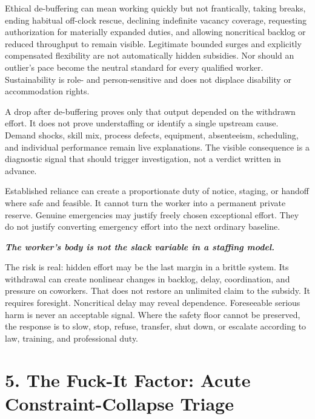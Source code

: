 \documentclass[11pt,oneside]{article}
\renewenvironment{quote}
  {\begin{tcolorbox}[
      enhanced,
      breakable,
      colback=ManifestLight,
      colframe=ManifestRule,
      boxrule=0pt,
      leftrule=3pt,
      arc=0pt,
      outer arc=0pt,
      left=10pt,right=10pt,top=8pt,bottom=8pt,
      before skip=0.8em,after skip=0.8em
    ]\itshape}
  {\end{tcolorbox}}
\begin{document}
Ethical de-buffering can mean working quickly but not frantically,
taking breaks, ending habitual off-clock rescue, declining indefinite
vacancy coverage, requesting authorization for materially expanded
duties, and allowing noncritical backlog or reduced throughput to remain
visible. Legitimate bounded surges and explicitly compensated
flexibility are not automatically hidden subsidies. Nor should an
outlier's pace become the neutral standard for every qualified worker.
Sustainability is role- and person-sensitive and does not displace
disability or accommodation rights.

A drop after de-buffering proves only that output depended on the
withdrawn effort. It does not prove understaffing or identify a single
upstream cause. Demand shocks, skill mix, process defects, equipment,
absenteeism, scheduling, and individual performance remain live
explanations. The visible consequence is a diagnostic signal that should
trigger investigation, not a verdict written in advance.

Established reliance can create a proportionate duty of notice, staging,
or handoff where safe and feasible. It cannot turn the worker into a
permanent private reserve. Genuine emergencies may justify freely chosen
exceptional effort. They do not justify converting emergency effort into
the next ordinary baseline.

\begin{quote}
\textbf{The worker's body is not the slack variable in a staffing
model.}
\end{quote}

The risk is real: hidden effort may be the last margin in a brittle
system. Its withdrawal can create nonlinear changes in backlog, delay,
coordination, and pressure on coworkers. That does not restore an
unlimited claim to the subsidy. It requires foresight. Noncritical delay
may reveal dependence. Foreseeable serious harm is never an acceptable
signal. Where the safety floor cannot be preserved, the response is to
slow, stop, refuse, transfer, shut down, or escalate according to law,
training, and professional duty.

\hypertarget{the-fuck-it-factor-acute-constraint-collapse-triage}{%
\section{5. The Fuck-It Factor: Acute Constraint-Collapse
Triage}\label{the-fuck-it-factor-acute-constraint-collapse-triage}}
\end{document}
